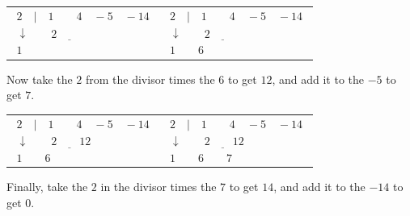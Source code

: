 \documentclass{ximera}
\begin{document}
\begin{center}
\begin{tabular}{cc}
$
\begin{array}{r}
 2 \quad |\quad 1 \quad\quad 4 \quad -5 \quad -14 \\
 \underline{\downarrow \quad\quad  2 \quad\quad \phantom{12 \quad\quad .4 }}\\
1 \quad\quad \phantom{6 \quad\quad 7 \quad\quad\quad 0}
\end{array}
$

\quad\quad\quad 
&
\quad\quad\quad

$
\begin{array}{r}
 2 \quad |\quad 1 \quad\quad 4 \quad -5 \quad -14 \\
 \underline{\downarrow \quad\quad  2 \quad\quad \phantom{12 \quad\quad .4 }}\\
1 \quad\quad 6 \quad\quad \phantom{7 \quad\quad\quad 0}
\end{array}
$

\end{tabular}
\end{center}

Now take the $2$ from the divisor times the $6$ to get $12$, and add it to the $-5$ to get $7$.

\begin{center}
\begin{tabular}{cc}
$
\begin{array}{r}
 2 \quad |\quad 1 \quad\quad 4 \quad -5 \quad -14 \\
 \underline{\downarrow \quad\quad  2 \quad\quad 12 \quad\quad \phantom{.4}}\\
1 \quad\quad 6 \quad\quad \phantom{7 \quad\quad\quad 0}
\end{array}
$

\quad\quad\quad 
&
\quad\quad\quad

$
\begin{array}{r}
 2 \quad |\quad 1 \quad\quad 4 \quad -5 \quad -14 \\
 \underline{\downarrow \quad\quad  2 \quad\quad 12 \quad\quad \phantom{.4 }}\\
1 \quad\quad 6 \quad\quad 7 \quad\quad\quad \phantom{0}
\end{array}
$

\end{tabular}
\end{center}


Finally, take the $2$ in the divisor times the $7$ to get $14$, and add it to the $-14$ to get $0$.
\end{document}
